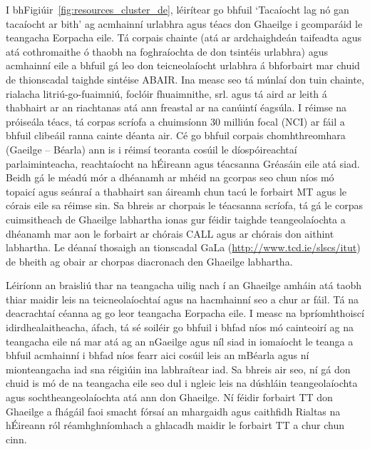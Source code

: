 \begin{multicols}{2}
I bhFigiúir~\ref{fig:resources_cluster_de}, léirítear go bhfuil ‘Tacaíocht lag nó gan tacaíocht ar bith’ ag acmhainní urlabhra agus téacs don Ghaeilge i gcomparáid le teangacha Eorpacha eile. Tá corpais chainte (atá ar ardchaighdeán taifeadta agus atá cothromaithe ó thaobh na foghraíochta de don tsintéis urlabhra) agus acmhainní eile a bhfuil gá leo don teicneolaíocht urlabhra á bhforbairt mar chuid de thionscadal taighde sintéise ABAIR. Ina measc seo tá múnlaí don tuin chainte, rialacha litriú-go-fuaimniú, foclóir fhuaimnithe, srl. agus tá aird ar leith á thabhairt ar an riachtanas atá ann freastal ar na canúintí éagsúla. I réimse na próiseála téacs, tá corpas scríofa a chuimsíonn 30 milliún focal (NCI) ar fáil a bhfuil clibeáil ranna cainte déanta air. Cé go bhfuil corpais chomhthreomhara (Gaeilge -- Béarla) ann \cite{scannell} is i réimsí teoranta cosúil le díospóireachtaí parlaiminteacha, reachtaíocht na hÉireann agus téacsanna Gréasáin eile atá siad. Beidh gá le méadú mór a dhéanamh ar mhéid na gcorpas seo chun níos mó topaicí agus seánraí a thabhairt san áireamh chun tacú le forbairt MT agus le córais eile sa réimse sin. Sa bhreis ar chorpais le téacsanna scríofa, tá gá le corpas cuimsitheach de Ghaeilge labhartha ionas gur féidir taighde teangeolaíochta a dhéanamh mar aon le forbairt ar chórais CALL agus ar chórais don aithint labhartha. Le déanaí thosaigh an tionscadal GaLa (\url{http://www.tcd.ie/slscs/itut}) de bheith ag obair ar chorpas diacronach den Ghaeilge labhartha.

Léiríonn an braisliú thar na teangacha uilig nach í an Ghaeilge amháin atá taobh thiar maidir leis na teicneolaíochtaí agus na hacmhainní seo a chur ar fáil. Tá na deacrachtaí céanna ag go leor teangacha Eorpacha eile. I measc na bpríomhthoiscí idirdhealaitheacha, áfach, tá sé soiléir go bhfuil i bhfad níos mó cainteoirí ag na teangacha eile ná mar atá ag an nGaeilge agus níl siad in iomaíocht le teanga a bhfuil acmhainní i bhfad níos fearr aici cosúil leis an mBéarla agus ní mionteangacha iad sna réigiúin ina labhraítear iad. Sa bhreis air seo, ní gá don chuid is mó de na teangacha eile seo dul i ngleic leis na dúshláin teangeolaíochta agus sochtheangeolaíochta atá ann don Ghaeilge. Ní féidir forbairt TT don Ghaeilge a fhágáil faoi smacht fórsaí an mhargaidh agus caithfidh Rialtas na hÉireann ról réamhghníomhach a ghlacadh maidir le forbairt TT a chur chun cinn.


\end{multicols}
